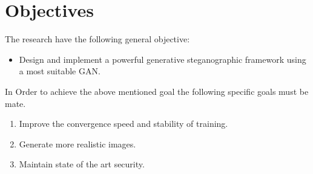 \documentclass[../main/main.tex]{subfiles}
\begin{document}
	
	\section{Objectives}
	The research have the following general objective:
	\begin{itemize}
		\item Design and implement a powerful generative steganographic framework using a most suitable \gls{GAN}. 
	\end{itemize}
	
	\noindent In Order to achieve the above mentioned goal the following specific goals must be mate. 
	\begin{enumerate}
		\item Improve the convergence speed and stability of training.
		\item Generate more realistic images.
		\item Maintain state of the art security.
	\end{enumerate}	
\end{document}
